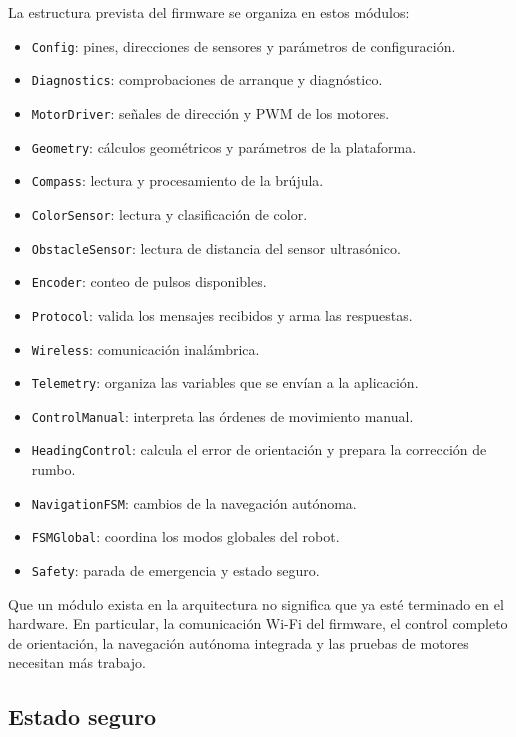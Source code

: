 \documentclass[journal]{IEEEtran}
\begin{document}
La estructura prevista del firmware se organiza en estos módulos:

\begin{itemize}
    \item \texttt{Config}: pines, direcciones de sensores y parámetros de configuración.
    \item \texttt{Diagnostics}: comprobaciones de arranque y diagnóstico.
    \item \texttt{MotorDriver}: señales de dirección y PWM de los motores.
    \item \texttt{Geometry}: cálculos geométricos y parámetros de la plataforma.
    \item \texttt{Compass}: lectura y procesamiento de la brújula.
    \item \texttt{ColorSensor}: lectura y clasificación de color.
    \item \texttt{ObstacleSensor}: lectura de distancia del sensor ultrasónico.
    \item \texttt{Encoder}: conteo de pulsos disponibles.
    \item \texttt{Protocol}: valida los mensajes recibidos y arma las respuestas.
    \item \texttt{Wireless}: comunicación inalámbrica.
    \item \texttt{Telemetry}: organiza las variables que se envían a la aplicación.
    \item \texttt{ControlManual}: interpreta las órdenes de movimiento manual.
    \item \texttt{HeadingControl}: calcula el error de orientación y prepara la corrección de rumbo.
    \item \texttt{NavigationFSM}: cambios de la navegación autónoma.
    \item \texttt{FSMGlobal}: coordina los modos globales del robot.
    \item \texttt{Safety}: parada de emergencia y estado seguro.
\end{itemize}

Que un módulo exista en la arquitectura no significa que ya esté terminado en el hardware. En particular, la comunicación Wi-Fi del firmware, el control completo de orientación, la navegación autónoma integrada y las pruebas de motores necesitan más trabajo.

\subsection{Estado seguro}
\end{document}
